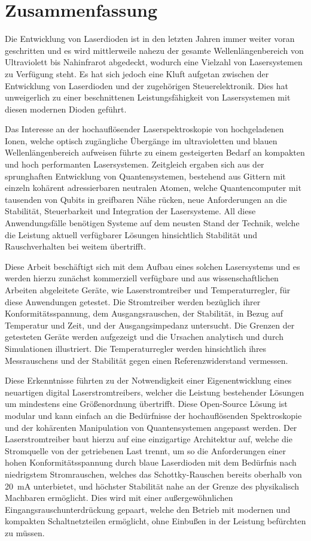 \section*{Zusammenfassung}
Die Entwicklung von Laserdioden ist in den letzten Jahren immer weiter voran geschritten und es wird mittlerweile nahezu der gesamte Wellenlängenbereich von Ultraviolett bis Nahinfrarot abgedeckt, wodurch eine Vielzahl von Lasersystemen zu Verfügung steht. Es hat sich jedoch eine Kluft aufgetan zwischen der Entwicklung von Laserdioden und der zugehörigen Steuerelektronik. Dies hat unweigerlich zu einer beschnittenen Leistungsfähigkeit von Lasersystemen mit diesen modernen Dioden geführt.

Das Interesse an der hochauflösender Laserspektroskopie von hochgeladenen Ionen, welche optisch zugängliche Übergänge im ultravioletten und blauen Wellenlängenbereich aufweisen führte zu einem gesteigerten Bedarf an kompakten und hoch performanten Lasersystemen. Zeitgleich ergaben sich aus der sprunghaften Entwicklung von Quantensystemen, bestehend aus Gittern mit einzeln kohärent adressierbaren neutralen Atomen, welche Quantencomputer mit tausenden von Qubits in greifbaren Nähe rücken, neue Anforderungen an die Stabilität, Steuerbarkeit und Integration der Lasersysteme. All diese Anwendungsfälle benötigen Systeme auf dem neusten Stand der Technik, welche die Leistung aktuell verfügbarer Lösungen hinsichtlich Stabilität und Rauschverhalten bei weitem übertrifft.

Diese Arbeit beschäftigt sich mit dem Aufbau eines solchen Lasersystems und es werden hierzu zunächst kommerziell verfügbare und aus wissenschaftlichen Arbeiten abgeleitete Geräte, wie Laserstromtreiber und Temperaturregler, für diese Anwendungen getestet. Die Stromtreiber werden bezüglich ihrer Konformitätsspannung, dem Ausgangsrauschen, der Stabilität, in Bezug auf Temperatur und Zeit, und der Ausgangsimpedanz untersucht. Die Grenzen der getesteten Geräte werden aufgezeigt und die Ursachen analytisch und durch Simulationen illustriert. Die Temperaturregler werden hinsichtlich ihres Messrauschens und der Stabilität gegen einen Referenzwiderstand vermessen.

Diese Erkenntnisse führten zu der Notwendigkeit einer Eigenentwicklung eines neuartigen digital Laserstromtreibers, welcher die Leistung bestehender Lösungen um mindestens eine Größenordnung übertrifft. Diese Open-Source Lösung ist modular und kann einfach an die Bedürfnisse der hochauflösenden Spektroskopie und der kohärenten Manipulation von Quantensystemen angepasst werden. Der Laserstromtreiber baut hierzu auf eine einzigartige Architektur auf, welche die Stromquelle von der getriebenen Last trennt, um so die Anforderungen einer hohen Konformitätsspannung durch blaue Laserdioden mit dem Bedürfnis nach niedrigstem Stromrauschen, welches das Schottky-Rauschen bereits oberhalb von \qty{20}{\mA} unterbietet, und höchster Stabilität nahe an der Grenze des physikalisch Machbaren ermöglicht. Dies wird mit einer außergewöhnlichen Eingangsrauschunterdrückung gepaart, welche den Betrieb mit modernen und kompakten Schaltnetzteilen ermöglicht, ohne Einbußen in der Leistung befürchten zu müssen.

